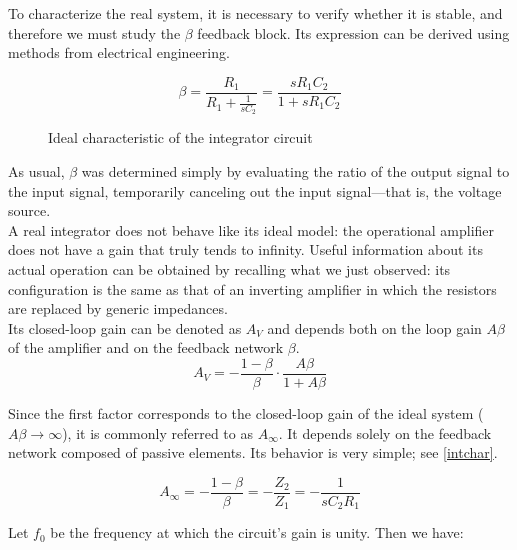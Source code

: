\documentclass[../main.tex]{subfiles}
\begin{document}
To characterize the real system, it is necessary to verify whether it is stable, and therefore we must study the $\beta$ feedback block. Its expression can be derived using methods from electrical engineering.



\begin{equation}
	\beta = \dfrac{R_1}{R_1 + \frac{1}{sC_2}} = \dfrac{sR_1C_2}{1 + sR_1C_2} 
\end{equation}


\begin{figure}[h!]
\begin{center}

\label{intchar}
\caption{Ideal characteristic of the integrator circuit }	
\end{center}	
\end{figure}

As usual, $\beta$ was determined simply by evaluating the ratio of the output signal to the input signal, temporarily canceling out the input signal—that is, the voltage source.\\

A real integrator does not behave like its ideal model: the operational amplifier does not have a gain that truly tends to infinity. Useful information about its actual operation can be obtained by recalling what we just observed: its configuration is the same as that of an inverting amplifier in which the resistors are replaced by generic impedances.\\

Its closed-loop gain can be denoted as $A_V$ and depends both on the loop gain $A\beta$ of the amplifier and on the feedback network $\beta$.\\

\begin{equation}
	A_V = - \frac{1 - \beta}{\beta} \cdot \frac{A\beta}{1 + A\beta}
\end{equation}

Since the first factor corresponds to the closed-loop gain of the ideal system ($A\beta \rightarrow \infty$), it is commonly referred to as $A_{\infty}$. It depends solely on the feedback network composed of passive elements. Its behavior is very simple; see \autoref{intchar}.

\begin{equation}
	A_{\infty} = - \frac{1 - \beta}{\beta} = - \frac{Z_2}{Z_1} = - \frac{1}{sC_2R_1}
\end{equation}

Let $f_0$ be the frequency at which the circuit's gain is unity. 
Then we have:
\end{document}
